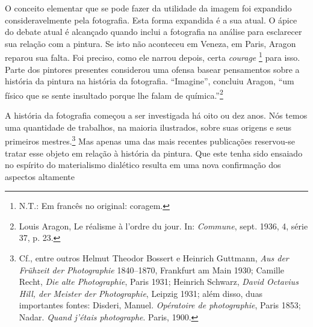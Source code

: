 O conceito elementar que se pode fazer da utilidade da imagem foi
expandido consideravelmente pela fotografia. Esta forma expandida é a
sua atual. O ápice do debate atual é alcançado quando inclui a
fotografia na análise para esclarecer sua relação com a pintura. Se isto
não aconteceu em Veneza, em Paris, Aragon reparou sua falta. Foi
preciso, como ele narrou depois, certa \emph{courage} \footnote{N.T.: Em
  francês no original: coragem.} para isso. Parte dos pintores presentes
considerou uma ofensa basear pensamentos sobre a história da pintura na
história da fotografia. ``Imagine'', concluiu Aragon, ``um físico que se
sente insultado porque lhe falam de química.''\footnote{Louis Aragon, Le
  réalisme à l'ordre du jour. In: \emph{Commune}, sept. 1936, 4, série
  37, p. 23.}

A história da fotografia começou a ser investigada há oito ou dez anos.
Nós temos uma quantidade de trabalhos, na maioria ilustrados, sobre suas
origens e seus primeiros mestres.\footnote{Cf., entre outros Helmut
  Theodor Bossert e Heinrich Guttmann, \emph{Aus der Frühzeit der
  Photographie} 1840--1870, Frankfurt am Main 1930; Camille Recht,
  \emph{Die alte Photographie}, Paris 1931; Heinrich Schwarz,
  \emph{David Octavius Hill, der Meister der Photographie}, Leipzig
  1931; além disso, duas importantes fontes: Disderi, Manuel.
  \emph{Opératoire de photographie}, Paris 1853; Nadar. \emph{Quand
  j'étais photographe}. Paris, 1900.} Mas apenas uma das mais recentes
publicações reservou-se tratar esse objeto em relação à história da
pintura. Que este tenha sido ensaiado no espírito do materialismo
dialético resulta em uma nova confirmação dos aspectos altamente
